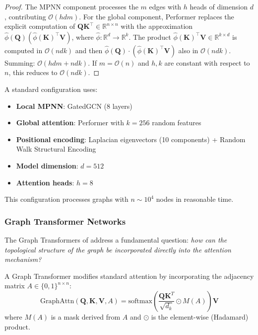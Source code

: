 \begin{proof}
The MPNN component processes the $m$ edges with $h$ heads of dimension $d$, contributing $\mathcal{O}(hdm)$. For the global component, Performer replaces the explicit computation of $\mathbf{Q}\mathbf{K}^\top \in \mathbb{R}^{n \times n}$ with the approximation $\hat{\phi}(\mathbf{Q})(\hat{\phi}(\mathbf{K})^\top \mathbf{V})$, where $\hat{\phi}: \mathbb{R}^d \to \mathbb{R}^k$. The product $\hat{\phi}(\mathbf{K})^\top \mathbf{V} \in \mathbb{R}^{k \times d}$ is computed in $\mathcal{O}(ndk)$ and then $\hat{\phi}(\mathbf{Q}) \cdot (\hat{\phi}(\mathbf{K})^\top \mathbf{V})$ also in $\mathcal{O}(ndk)$. Summing: $\mathcal{O}(hdm + ndk)$. If $m = \mathcal{O}(n)$ and $h, k$ are constant with respect to $n$, this reduces to $\mathcal{O}(ndk)$.
\end{proof}

\begin{example}\label{ex:graphgps_configuration}
A standard configuration uses:
\begin{itemize}
    \item \textbf{Local MPNN}: GatedGCN (8 layers)
    \item \textbf{Global attention}: Performer with $k=256$ random features
    \item \textbf{Positional encoding}: Laplacian eigenvectors (10 components) + Random Walk Structural Encoding
    \item \textbf{Model dimension}: $d=512$
    \item \textbf{Attention heads}: $h=8$
\end{itemize}
This configuration processes graphs with $n \sim 10^4$ nodes in reasonable time.
\end{example}

\subsubsection{Graph \gls{Transformer} Networks}\label{subsubsec:graph_transformers}

The Graph \glspl{Transformer} of \citet{dwivedi2021generalization} address a fundamental question: \textit{how can the topological structure of the graph be incorporated directly into the attention mechanism?}

\begin{definition}\label{def:graph_transformer_bias}
A Graph \gls{Transformer} modifies standard attention by incorporating the adjacency matrix $A \in \{0,1\}^{n \times n}$:
\begin{equation}
    \text{GraphAttn}(\mathbf{Q}, \mathbf{K}, \mathbf{V}, A) = \text{softmax}\left(\frac{\mathbf{Q}\mathbf{K}^T}{\sqrt{d_k}} \odot M(A)\right)\mathbf{V}
    \label{eq:graph_transformer_masked_attention}
\end{equation}
where $M(A)$ is a mask derived from $A$ and $\odot$ is the element-wise (Hadamard) product.
\end{definition}

